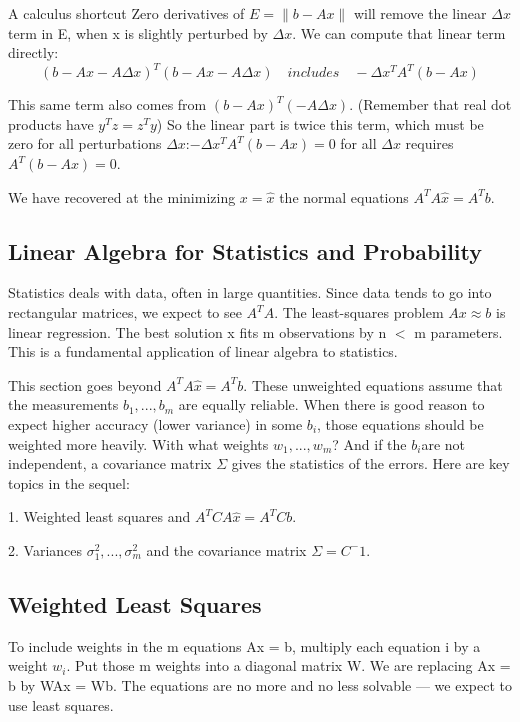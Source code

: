 	A calculus shortcut Zero derivatives of $E=\|b-Ax\|$ will remove the linear $\Delta x$ term in E, when x is slightly perturbed by $\Delta x$. We can compute that linear term directly:
	\begin{equation*}
	(b-Ax-A\Delta x)^T(b-Ax-A\Delta x)
	\quad includes \quad 
	-\Delta x^TA^T(b-Ax)
	\end{equation*} 
	
	This same term also comes from $(b-Ax)^T(-A\Delta x)$. (Remember that real dot products have $y^Tz=z^Ty$) So the linear part is twice this term, which must be zero for all perturbations $\Delta x$:$-\Delta x^TA^T(b-Ax)=0$ for all $\Delta x$ requires $A^T(b-Ax)=0$.
	
	We have recovered at the minimizing $x=\hat{x}$ the normal equations $A^TA\hat{x}=A^Tb$.
	
	\subsection{Linear Algebra for Statistics and Probability}	
	Statistics deals with data, often in large quantities. Since data tends to go into rectangular matrices, we expect to see $A^TA$. The least-squares problem $Ax\approx b$ is linear regression. The best solution x fits m observations by n $<$ m parameters. This is a fundamental application of linear algebra to statistics.
	
	This section goes beyond $A^TA\hat{x}=A^Tb$. These unweighted equations assume that
	the measurements $b_1,...,b_m$ are equally reliable. When there is good reason to expect
	higher accuracy (lower variance) in some $b_i$, those equations should be weighted more
	heavily. With what weights $w_1,...,w_m$? And if the $b_i$are not independent, a covariance
	matrix $\Sigma$ gives the statistics of the errors. Here are key topics in the sequel:
	
	1. Weighted least squares and $A^TCA\hat{x}=A^TCb$.
	
	2. Variances $\sigma^2_1,...,\sigma^2_m$ and the covariance matrix $\Sigma=C^-1$.
	
	\subsection{Weighted Least Squares}
	To include weights in the m equations Ax = b, multiply each equation i by a weight $w_i$.
	Put those m weights into a diagonal matrix W. We are replacing Ax = b by WAx = Wb.
	The equations are no more and no less solvable — we expect to use least squares.
	
